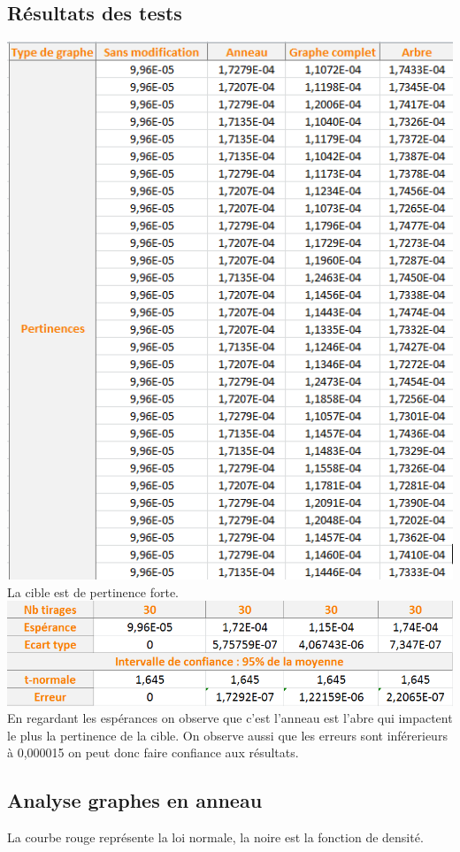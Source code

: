 \documentclass[a4paper,11pt]{article}
\begin{document}
	\subsection{Résultats des tests}
		\includegraphics[scale = 0.5]{Captures/ranking2.PNG}\\
		La cible est de pertinence forte. \\
		\includegraphics[scale = 0.5]{Captures/ranking3.PNG}\\
		En regardant les espérances on observe que c'est l'anneau est l'abre qui impactent le plus la pertinence de la cible.
		On observe aussi que les erreurs sont inférerieurs à 0,000015 on peut donc faire confiance aux résultats.\\

	\subsection{Analyse graphes en anneau}
		
		La courbe rouge représente la loi normale, la noire est la fonction de densité. 
\end{document}
